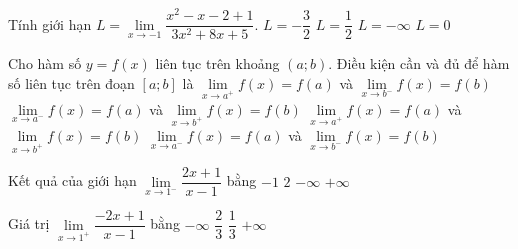 

\begin{ex}%
	Tính  giới hạn $L=\lim\limits_{x\to-1}\dfrac{x^2-x-2+1}{3x^2+8x+5}$.
	\choice 
		{\True$L=-\dfrac{3}{2}$} 
		 {$L=\dfrac{1}{2}$}
		{$L=-\infty$} 
		 {$L=0$}
\end{ex}

\begin{ex}%
	Cho hàm số $y=f(x)$ liên tục trên khoảng $(a;b)$. Điều kiện cần và đủ để hàm số liên tục trên đoạn $[a;b]$ là 
	\choice 
		{\True $\lim\limits_{x\to a^{+}}f(x)=f(a)$ và  $\lim\limits_{x\to b^{-}}f(x)=f(b)$}
		{$\lim\limits_{x\to a^{-}}f(x)=f(a)$ và $\lim\limits_{x\to b^{+}}f(x)=f(b)$} 
		{$\lim\limits_{x\to a^{+}}f(x)=f(a)$ và  $\lim\limits_{x\to b^{+}}f(x)=f(b)$}
		{$\lim\limits_{x\to a^{-}}f(x)=f(a)$  và $\lim\limits_{x\to b^{-}}f(x)=f(b)$}
\end{ex}

\begin{ex}%
	Kết  quả của giới hạn ${\mathop{\lim}\limits_{x\to 1^{-}}} \dfrac{2x+1}{x-1}$ bằng
	\choice 
		 {$-1$}
		 {$2$}
		{\True  $-\infty$}
		{$+\infty$} 
\end{ex}

\begin{ex}%
	Giá trị $\lim\limits_{x\to  1^+} \dfrac{-2x+1}{x-1}$ bằng
	\choice 
		 {\True $-\infty$}
		{$\dfrac{2}{3}$} 
		 {$\dfrac{1}{3}$}
		{$+\infty$} 
\end{ex}

